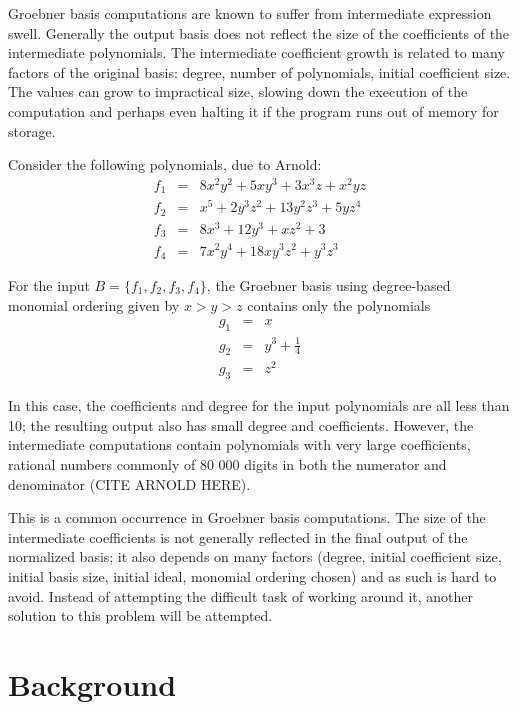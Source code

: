 \documentclass[letterpaper,12pt,titlepage,oneside,final]{book}
\begin{document}
Groebner basis computations are known to suffer from intermediate expression swell.  Generally the output basis does not reflect the size of the coefficients of the intermediate polynomials.  The intermediate coefficient growth is related to many factors of the original basis: degree, number of polynomials, initial coefficient size.  The values can grow to impractical size, slowing down the execution of the computation and perhaps even halting it if the program runs out of memory for storage.  

Consider the following polynomials, due to Arnold: %
\begin{eqnarray*}
  f_1 &=& 8x^2y^2 + 5xy^3 + 3x^3z + x^2yz\\
  f_2 &=& x^5 + 2y^3z^2 + 13y^2z^3 + 5yz^4\\ 
  f_3 &=& 8x^3 + 12y^3 + xz^2 + 3\\
  f_4 &=& 7x^2y^4 + 18xy^3z^2 + y^3z^3
\end{eqnarray*} 

For the input ${B = \{f_1, f_2, f_3, f_4\}}$, the Groebner basis using degree-based monomial ordering given by ${x > y > z}$ contains only the polynomials
\begin{eqnarray*}
  g_1 &=& x\\
  g_2 &=& y^3 + \frac{1}{4}\\ 
  g_3 &=& z^2
\end{eqnarray*} 

In this case, the coefficients and degree for the input polynomials are all less than 10; the resulting output also has small degree and coefficients.  However, the intermediate computations contain polynomials with very large coefficients, rational numbers commonly of 80 000 digits in both the numerator and denominator (CITE ARNOLD HERE).  

This is a common occurrence in Groebner basis computations.  The size of the intermediate coefficients is not generally reflected in the final output of the normalized basis; it also depends on many factors (degree, initial coefficient size, initial basis size, initial ideal, monomial ordering chosen) and as such is hard to avoid.  Instead of attempting the difficult task of working around it, another solution to this problem will be attempted.



\chapter{Background}\label{chpt:bg}
\end{document}
